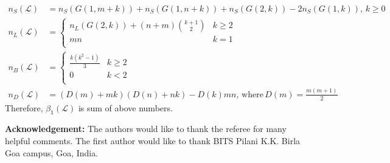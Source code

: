 \documentclass[10pt,reqno]{amsart}
\numberwithin{equation}{section}
\begin{document}
	\begin{align*}
			n_{S}(\mathcal{L}) &=n_S(G(1,m+k))+ n_S(G(1,n+k))+ n_S(G(2,k))-2 n_S(G(1,k)),  \, k\geq 0\\
			n_{L}(\mathcal{L})& =
			\begin{cases}
			n_{L}(G(2,k))+(n+m) \binom{k+1}{2} & k \geq 2	\\
			mn &  k=1\\
			\end{cases}
	\\
			n_{B}(\mathcal{L}) &=
			\begin{cases}
		      \frac{k(k^2-1)}{3}   & k \geq 2	\\
		     	0 & k< 2\\
			\end{cases}
		\\
			n_{D}(\mathcal{L}) &=(D(m)+mk)(D(n)+nk)-D(k)mn,\,  \text{where} \,D(m)=\frac{m(m+1)}{2}
		\end{align*}
		Therefore, $\beta_1(\mathcal{L})$ is sum of above numbers.



\textbf{Acknowledgement:} The authors would like to thank the referee for many helpful comments. The first author would like to thank BITS Pilani K.K. Birla Goa campus, Goa, India.



\end{document}
